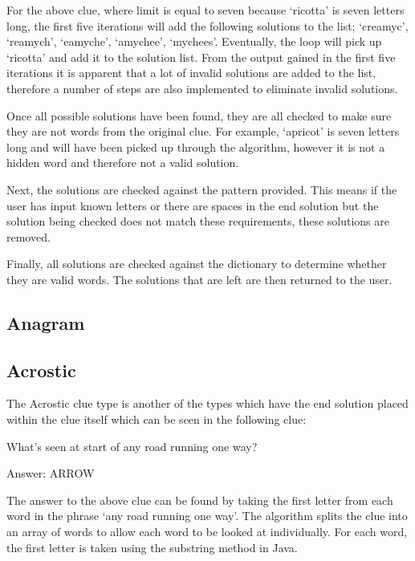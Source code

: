 For the above clue, where limit is equal to seven because `ricotta' is seven
letters  long, the first five iterations will add the following solutions to the
list; `creamyc',  `reamych', `eamyche', `amychee', `mychees'. Eventually, the
loop will pick up  `ricotta' and add it to the solution list. From the output
gained in the first five  iterations it is apparent that a lot of invalid
solutions are added to the list, therefore a number of steps are also
implemented to eliminate invalid solutions.

Once all possible solutions have been found, they are all checked to make sure
they are not words from the original clue. For example, `apricot' is seven
letters long and will  have been picked up through the algorithm, however it is
not a hidden word and therefore  not a valid solution.

Next, the solutions are checked against the pattern provided. This means if the
user  has input known letters or there are spaces in the end solution but the
solution being  checked does not match these requirements, these solutions are
removed.

Finally, all solutions are checked against the dictionary to determine whether
they  are valid words. The solutions that are left are then returned to the
user.

\subsection{Anagram}

\subsection{Acrostic}

The Acrostic clue type is another of the types which have the end solution
placed within  the clue itself which can be seen in the following clue:

What's seen at start of any road running one way?

Answer: ARROW

The answer to the above clue can be found by taking the first letter from each
word in  the phrase `any road running one way'. The algorithm splits the clue
into an array of words  to allow each word to be looked at individually. For
each word, the first letter is taken  using the substring method in Java.


